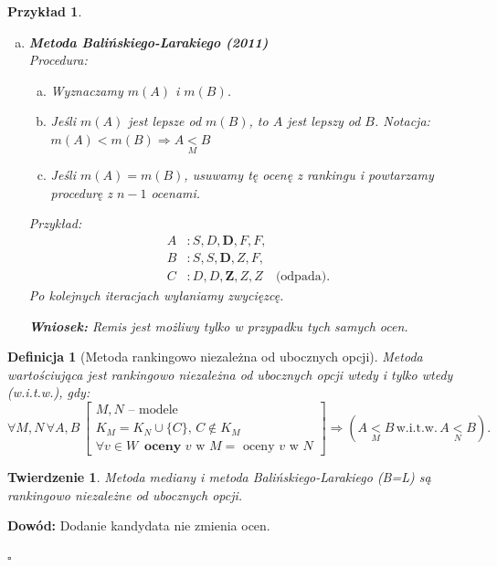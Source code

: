 \documentclass[12pt,a4paper]{article}
\theoremstyle{break}
\newtheorem{definition}{Definicja}[section]
\newtheorem{theorem}{Twierdzenie}[section]
\newtheorem{example}{Przykład}[section]
\begin{document}
\begin{example}
\begin{enumerate}[a)]
			\item \textbf{Metoda Balińskiego-Larakiego (2011)} \\
			Procedura:
			\begin{enumerate}[a)]
				\item Wyznaczamy $m(A)$ i $m(B)$.
				\item Jeśli $m(A)$ jest lepsze od $m(B)$, to $A$ jest lepszy od $B$. Notacja: $m(A)<m(B) \Rightarrow A \underset{M}{<}B$
				\item Jeśli $m(A) = m(B)$, usuwamy tę ocenę z rankingu i powtarzamy procedurę z $n-1$ ocenami.
			\end{enumerate}
			Przykład:
			\begin{align*}
				A &: S, D, \mathbf{D}, F, F, \\
				B &: S, S, \mathbf{D}, Z, F, \\
				C &: D, D, \mathbf{Z}, Z, Z \quad \text{(odpada)}.
			\end{align*}
			Po kolejnych iteracjach wyłaniamy zwycięzcę.
			
			\textbf{Wniosek:} Remis jest możliwy tylko w przypadku tych samych ocen.
		\end{enumerate}
	\end{example}
	
	\begin{definition}[Metoda rankingowo niezależna od ubocznych opcji]
		Metoda wartościująca jest rankingowo niezależna od ubocznych opcji wtedy i tylko wtedy (w.i.t.w.), gdy:
		\[
		\forall M, N \, \forall A, B \, 
		\begin{bmatrix}
			M, N \text{ -- modele} \\
			K_M = K_N \cup \{C\}, \, C \notin K_M \\
			\forall v \in W \, \textbf{ oceny } v \text{ w } M = \text{ oceny } v \text{ w } N
		\end{bmatrix}
		\Rightarrow 
		(A \underset{M}{<} B \, \text{w.i.t.w.} \, A \underset{N}{<} B).
		\]
	\end{definition}
	
	\begin{theorem}
		Metoda mediany i metoda Balińskiego-Larakiego (B=L) są rankingowo niezależne od ubocznych opcji.
	\end{theorem}
	
	\noindent \textbf{Dowód:} Dodanie kandydata nie zmienia ocen.  
	\begin{flushright}
		$\square$
	\end{flushright}
	
\end{document}

